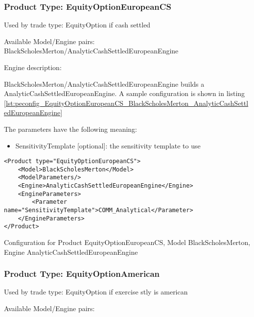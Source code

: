 \subsubsection{Product Type: EquityOptionEuropeanCS}

Used by trade type: EquityOption if cash settled

Available Model/Engine pairs: BlackScholesMerton/AnalyticCashSettledEuropeanEngine

Engine description:

BlackScholesMerton/AnalyticCashSettledEuropeanEngine builds a AnalyticCashSettledEuropeanEngine. A sample configuration is shown in listing
\ref{lst:peconfig_EquityOptionEuropeanCS_BlackScholesMerton_AnalyticCashSettledEuropeanEngine}

The parameters have the following meaning:

\begin{itemize}
\item SensitivityTemplate [optional]: the sensitivity template to use 
\end{itemize}

\begin{longlisting}
\begin{verbatim}
<Product type="EquityOptionEuropeanCS">
    <Model>BlackScholesMerton</Model>
    <ModelParameters/>
    <Engine>AnalyticCashSettledEuropeanEngine</Engine>
    <EngineParameters>
        <Parameter name="SensitivityTemplate">COMM_Analytical</Parameter>
    </EngineParameters>
</Product>
\end{verbatim}
\caption{Configuration for Product EquityOptionEuropeanCS, Model BlackScholesMerton, Engine AnalyticCashSettledEuropeanEngine}
\label{lst:peconfig_EquityOptionEuropeanCS_BlackScholesMerton_AnalyticCashSettledEuropeanEngine}
\end{longlisting}

\subsubsection{Product Type: EquityOptionAmerican}

Used by trade type: EquityOption if exercise stly is american

Available Model/Engine pairs:

